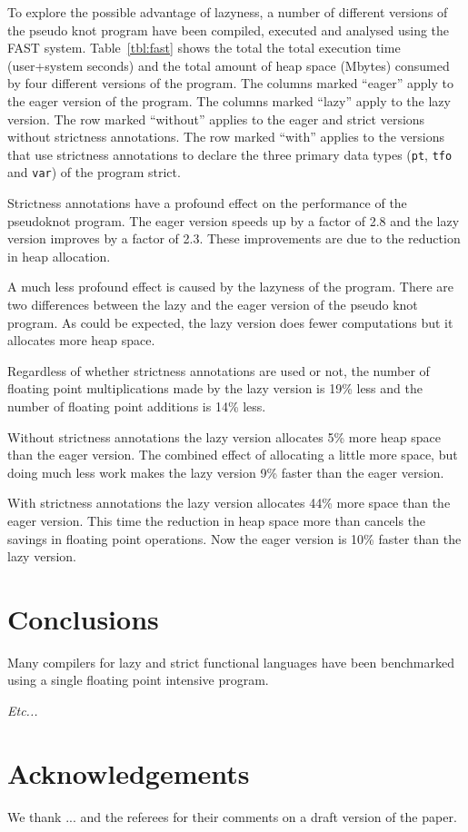 To explore the possible advantage of lazyness, a number of different
versions of the pseudo knot program have been compiled, executed and
analysed using the FAST system. Table~\ref{tbl:fast} shows the total
the total execution time (user+system seconds) and the total amount of
heap space (Mbytes) consumed by four different versions of the program.
The columns marked ``eager'' apply to the eager version of the program.
The columns marked ``lazy'' apply to the lazy version. The row marked
``without'' applies to the eager and strict versions without strictness
annotations. The row marked ``with'' applies to the versions that use
strictness annotations to declare the three primary data types
(\verb=pt=, \verb=tfo= and \verb=var=) of the program strict.

Strictness annotations have a profound effect on the performance of the
pseudoknot program. The eager version speeds up by a factor of 2.8 and
the lazy version improves by a factor of 2.3. These improvements are
due to the reduction in heap allocation.

A much less profound effect is caused by the lazyness of the program.
There are two differences between the lazy and the eager version of the
pseudo knot program. As could be expected, the lazy version does fewer
computations but it allocates more heap space.

Regardless of whether strictness annotations are used or not, the
number of floating point multiplications made by the lazy version is
19\% less and the number of floating point additions is 14\% less.

Without strictness annotations the lazy version allocates 5\% more heap
space than the eager version. The combined effect of allocating a
little more space, but doing much less work makes the lazy version 9\%
faster than the eager version.

With strictness annotations the lazy version allocates 44\% more space
than the eager version. This time the reduction in heap space more than
cancels the savings in floating point operations. Now the eager version
is 10\% faster than the lazy version.


\section{Conclusions}
Many compilers for lazy and strict functional languages have been
benchmarked using a single floating point intensive program.

{\em Etc...}

\section*{Acknowledgements}
We thank
...
and the referees for their comments on a draft version of the paper.





